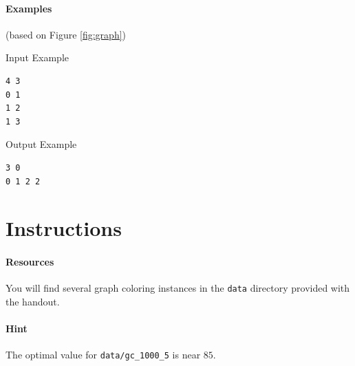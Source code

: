 \documentclass[11pt]{article}
\begin{document}
\paragraph{Examples} \mbox{}
\noindent
(based on Figure \ref{fig:graph})

\vspace{0.2cm}
\noindent
Input Example
\vspace{-0.2cm}
\begin{Verbatim}[frame=single]
4 3
0 1
1 2
1 3
\end{Verbatim}

\vspace{0.2cm}
\noindent
Output Example
\vspace{-0.2cm}
\begin{Verbatim}[frame=single]
3 0
0 1 2 2
\end{Verbatim}

\section{Instructions}




\paragraph{Resources}
You will find several graph coloring instances in the \texttt{data} directory provided with the handout.












\paragraph{Hint} 

The optimal value for  \texttt{data/gc\_1000\_5} is near $85$.
 

\end{document}
